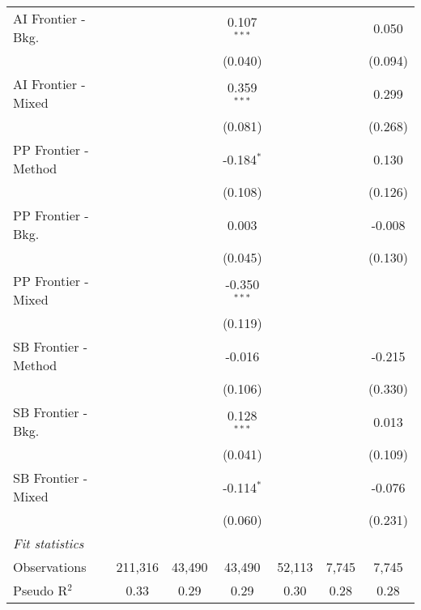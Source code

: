 \begin{tabular}{lcccccc}
   AI Frontier - Bkg.   &               &               & 0.107$^{***}$  &               &               & 0.050\\   
                        &               &               & (0.040)        &               &               & (0.094)\\   
   AI Frontier - Mixed  &               &               & 0.359$^{***}$  &               &               & 0.299\\   
                        &               &               & (0.081)        &               &               & (0.268)\\   
   PP Frontier - Method &               &               & -0.184$^{*}$   &               &               & 0.130\\   
                        &               &               & (0.108)        &               &               & (0.126)\\   
   PP Frontier - Bkg.   &               &               & 0.003          &               &               & -0.008\\   
                        &               &               & (0.045)        &               &               & (0.130)\\   
   PP Frontier - Mixed  &               &               & -0.350$^{***}$ &               &               &   \\   
                        &               &               & (0.119)        &               &               &   \\   
   SB Frontier - Method &               &               & -0.016         &               &               & -0.215\\   
                        &               &               & (0.106)        &               &               & (0.330)\\   
   SB Frontier - Bkg.   &               &               & 0.128$^{***}$  &               &               & 0.013\\   
                        &               &               & (0.041)        &               &               & (0.109)\\   
   SB Frontier - Mixed  &               &               & -0.114$^{*}$   &               &               & -0.076\\   
                        &               &               & (0.060)        &               &               & (0.231)\\   
   \midrule
   \emph{Fit statistics}\\
   Observations         & 211,316       & 43,490        & 43,490         & 52,113        & 7,745         & 7,745\\  
   Pseudo R$^2$         & 0.33          & 0.29          & 0.29           & 0.30          & 0.28          & 0.28\\  
   

\end{tabular}
